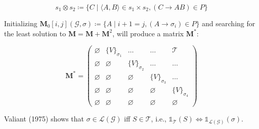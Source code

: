 \documentclass[portrait,a0b,final,a4resizeable]{a0poster}
\def\jointspacing{\vspace{0.3in}}
\begin{document}
\begin{poster}
\begin{multicols}{2}
      \[
        s_1 \otimes s_2 \coloneqq \{C \mid \langle A, B\rangle \in s_1 \times s_2, (C\rightarrow AB) \in P\}
      \]

      \null\hspace*{3cm}\begin{minipage}[c]{0.85\columnwidth}
          Initializing $\mathbf{M}_0[i, j](\mathcal{G}, \sigma) \coloneqq \{A \mid i + 1 = j, (A \rightarrow \sigma_i) \in P\}$ and searching for the least solution to $\mathbf{M} = \mathbf{M} + \mathbf{M}^2$, will produce a matrix $\mathbf{M}^*$:\\
      \end{minipage}

      \[
        \mathbf{M}^* = \begin{pmatrix}
                         \varnothing & \{V\}_{\sigma_1} & \ldots & \ldots & \mathcal{T} \\
                         \varnothing & \varnothing & \{V\}_{\sigma_2} & \ldots & \ldots \\
                         \varnothing & \varnothing & \varnothing & \{V\}_{\sigma_3} & \ldots \\
                         \varnothing & \varnothing & \varnothing & \varnothing & \{V\}_{\sigma_4} \\
                         \varnothing & \varnothing & \varnothing & \varnothing & \varnothing
        \end{pmatrix}
      \]

      \null\hspace*{3cm}\begin{minipage}[c]{0.85\columnwidth}
          Valiant (1975) shows that $\sigma \in \mathcal{L}(\mathcal{G})$ iff $S \in \mathcal{T}$, i.e., $\mathds{1}_{\mathcal{T}}(S) \iff \mathds{1}_{\mathcal{L}(\mathcal{G})}(\sigma)$.
      \end{minipage}

      \jointspacing


\end{multicols}
\end{poster}
\end{document}
